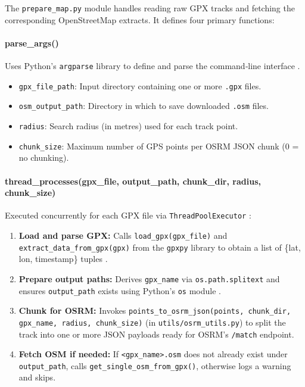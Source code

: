\documentclass[11pt,a4paper]{article}
\begin{document}
The \texttt{prepare\_map.py} module handles reading raw GPX tracks and fetching the corresponding OpenStreetMap extracts.  It defines four primary functions:

\paragraph{parse\_args()}
Uses Python’s \texttt{argparse} library to define and parse the command‐line interface \citep{python-argparse-doc}.
\begin{itemize}
	\item \texttt{gpx\_file\_path}: Input directory containing one or more \texttt{.gpx} files.
	\item \texttt{osm\_output\_path}: Directory in which to save downloaded \texttt{.osm} files.
	\item \texttt{radius}: Search radius (in metres) used for each track point.
	\item \texttt{chunk\_size}: Maximum number of GPS points per OSRM JSON chunk (0 = no chunking).
\end{itemize}

\paragraph{thread\_processes(gpx\_file, output\_path, chunk\_dir, radius, chunk\_size)}
Executed concurrently for each GPX file via \texttt{ThreadPoolExecutor} \citep{python-concurrent-doc}:
\begin{enumerate}
	\item \textbf{Load and parse GPX:} Calls \texttt{load\_gpx(gpx\_file)} and \texttt{extract\_data\_from\_gpx(gpx)} from the \texttt{gpxpy} library to obtain a list of \{lat, lon, timestamp\} tuples \citep{gpxpy}.
	\item \textbf{Prepare output paths:} Derives \texttt{gpx\_name} via \texttt{os.path.splitext} and ensures \texttt{output\_path} exists using Python’s \texttt{os} module \citep{python-os-doc}.
	\item \textbf{Chunk for OSRM:} Invokes \texttt{points\_to\_osrm\_json(points, chunk\_dir, gpx\_name, radius, chunk\_size)} (in \texttt{utils/osrm\_utils.py}) to split the track into one or more JSON payloads ready for OSRM’s \texttt{/match} endpoint.
	\item \textbf{Fetch OSM if needed:} If \texttt{\textless gpx\_name\textgreater{}.osm} does not already exist under \texttt{output\_path}, calls \texttt{get\_single\_osm\_from\_gpx()}, otherwise logs a warning and skips.
\end{enumerate}
\end{document}
